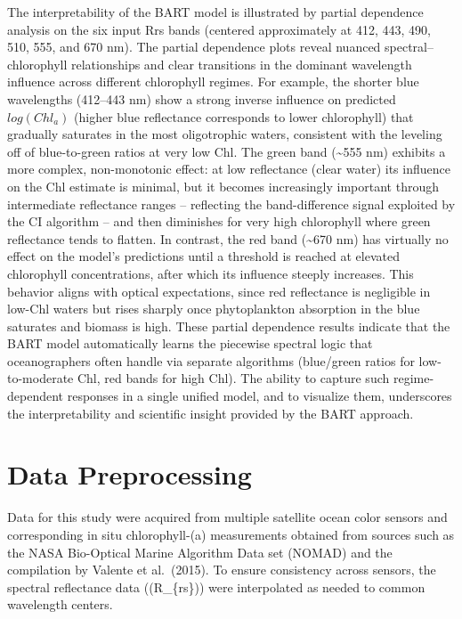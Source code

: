 \documentclass[
]{agujournal2019}
\begin{document}
The interpretability of the BART model is illustrated by partial
dependence analysis on the six input Rrs bands (centered approximately
at 412, 443, 490, 510, 555, and 670 nm). The partial dependence plots
reveal nuanced spectral--chlorophyll relationships and clear transitions
in the dominant wavelength influence across different chlorophyll
regimes. For example, the shorter blue wavelengths (412--443 nm) show a
strong inverse influence on predicted \(log(Chl_a)\) (higher blue
reflectance corresponds to lower chlorophyll) that gradually saturates
in the most oligotrophic waters, consistent with the leveling off of
blue-to-green ratios at very low Chl. The green band (\textasciitilde555
nm) exhibits a more complex, non-monotonic effect: at low reflectance
(clear water) its influence on the Chl estimate is minimal, but it
becomes increasingly important through intermediate reflectance ranges
-- reflecting the band-difference signal exploited by the CI algorithm
-- and then diminishes for very high chlorophyll where green reflectance
tends to flatten. In contrast, the red band (\textasciitilde670 nm) has
virtually no effect on the model's predictions until a threshold is
reached at elevated chlorophyll concentrations, after which its
influence steeply increases. This behavior aligns with optical
expectations, since red reflectance is negligible in low-Chl waters but
rises sharply once phytoplankton absorption in the blue saturates and
biomass is high. These partial dependence results indicate that the BART
model automatically learns the piecewise spectral logic that
oceanographers often handle via separate algorithms (blue/green ratios
for low-to-moderate Chl, red bands for high Chl). The ability to capture
such regime-dependent responses in a single unified model, and to
visualize them, underscores the interpretability and scientific insight
provided by the BART approach.

\section{Data Preprocessing}

Data for this study were acquired from multiple satellite ocean color
sensors and corresponding in situ chlorophyll-(a) measurements obtained
from sources such as the NASA Bio-Optical Marine Algorithm Data set
(NOMAD) and the compilation by Valente et al.~(2015). To ensure
consistency across sensors, the spectral reflectance data ((R\_\{rs\}))
were interpolated as needed to common wavelength centers.
\end{document}
